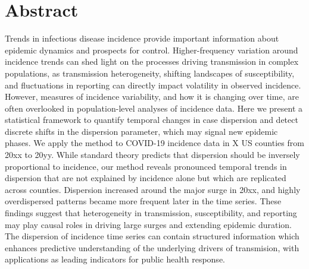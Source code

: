 \documentclass[10pt,letterpaper]{article}
\begin{document}
\section*{Abstract}
Trends in infectious disease incidence provide important information about epidemic dynamics and prospects for control. 
Higher-frequency variation around incidence trends can shed light on the processes driving transmission in complex populations, as transmission heterogeneity, shifting landscapes of susceptibility, and fluctuations in reporting can directly impact volatility in observed incidence.
However, measures of incidence variability, and how it is changing over time, are often overlooked in population-level analyses of incidence data.
Here we present a statistical framework to quantify temporal changes in case dispersion and detect discrete shifts in the dispersion parameter, which may signal new epidemic phases. 
We apply the method to COVID-19 incidence data in X US counties from 20xx to 20yy.
While standard theory predicts that dispersion should be inversely proportional to incidence, our method reveals pronounced temporal trends in dispersion that are not explained by incidence alone but which are replicated across counties. 
Dispersion increased around the major surge in 20xx, and highly overdispersed patterns became more frequent later in the time series.
These findings suggest that heterogeneity in transmission, susceptibility, and reporting may play causal roles in driving large surges and extending epidemic duration. 
The dispersion of incidence time series can contain structured information which enhances predictive understanding of the underlying drivers of transmision, with applications as leading indicators for public health response.



\end{document}
